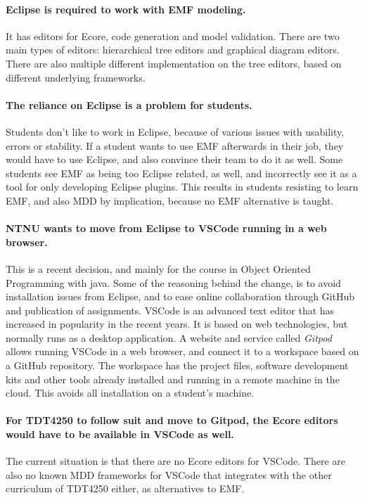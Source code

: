 \paragraph{\Gls{Eclipse} is required to work with \acrshort{EMF} modeling.}
It has editors for \gls{Ecore}, code generation and model validation.
There are two main types of editors: hierarchical tree editors and graphical diagram editors.
There are also multiple different implementation on the tree editors, based on different underlying frameworks.

\paragraph{The reliance on \gls{Eclipse} is a problem for students.}
Students don't like to work in Eclipse, because of various issues with usability, errors or stability. %
If a student wants to use \acrshort{EMF} afterwards in their job, they would have to use \gls{Eclipse}, and also convince their team to do it as well.
Some students see \acrshort{EMF} as being too \gls{Eclipse} related, as well, and incorrectly see it as a tool for only developing Eclipse plugins.
This results in students resisting to learn \acrshort{EMF}, and also \acrshort{MDD} by implication, because no \acrshort{EMF} alternative is taught.

\paragraph{\acrshort{NTNU} wants to move from \gls{Eclipse} to \gls{VSCode} running in a web browser.}
This is a recent decision, and mainly for the course in Object Oriented Programming with java.
Some of the reasoning behind the change, is to avoid installation issues from \gls{Eclipse}, and to ease online collaboration through \gls{GitHub} and publication of assignments. %
\gls{VSCode} is an advanced text editor that has increased in popularity in the recent years.
It is based on web technologies, but normally runs as a desktop application.
A website and service called \textit{\gls{Gitpod}} allows running \gls{VSCode} in a web browser, and connect it to a workspace based on a \gls{GitHub} repository.
The workspace has the project files, software development kits and other tools already installed and running in a remote machine in the \gls{cloud}.
This avoids all installation on a student's machine.

\paragraph{For \gls{TDT4250} to follow suit and move to \gls{Gitpod}, the \gls{Ecore} editors would have to be available in \gls{VSCode} as well.}
The current situation is that there are no \gls{Ecore} editors for \gls{VSCode}.
There are also no known \acrshort{MDD} frameworks for \gls{VSCode} that integrates with the other curriculum of \gls{TDT4250} either, as alternatives to \acrshort{EMF}.


